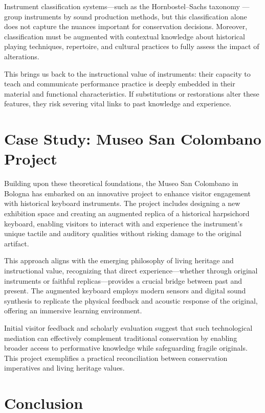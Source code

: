 Instrument classification systems—such as the Hornbostel–Sachs taxonomy \cite{hornbostel_classification_1914}—group instruments by sound production methods, but this classification alone does not capture the nuances important for conservation decisions. Moreover, classification must be augmented with contextual knowledge about historical playing techniques, repertoire, and cultural practices to fully assess the impact of alterations.

This brings us back to the instructional value of instruments: their capacity to teach and communicate performance practice is deeply embedded in their material and functional characteristics. If substitutions or restorations alter these features, they risk severing vital links to past knowledge and experience.

\section{Case Study: Museo San Colombano Project}

Building upon these theoretical foundations, the Museo San Colombano in Bologna has embarked on an innovative project to enhance visitor engagement with historical keyboard instruments. The project includes designing a new exhibition space and creating an augmented replica of a historical harpsichord keyboard, enabling visitors to interact with and experience the instrument’s unique tactile and auditory qualities without risking damage to the original artifact.

This approach aligns with the emerging philosophy of living heritage and instructional value, recognizing that direct experience—whether through original instruments or faithful replicas—provides a crucial bridge between past and present. The augmented keyboard employs modern sensors and digital sound synthesis to replicate the physical feedback and acoustic response of the original, offering an immersive learning environment.

Initial visitor feedback and scholarly evaluation suggest that such technological mediation can effectively complement traditional conservation by enabling broader access to performative knowledge while safeguarding fragile originals. This project exemplifies a practical reconciliation between conservation imperatives and living heritage values.

\section{Conclusion}

